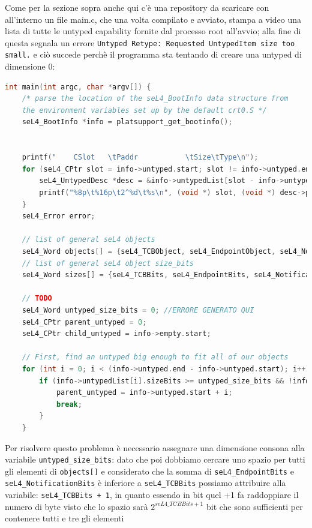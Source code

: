 Come per la sezione sopra anche qui c'è una repository da scaricare con all'interno un file main.c, che una volta compilato e avviato, stampa a video una lista di tutte le untyped capability fornite dal processo root all'avvio; alla fine di questa segnala un errore \texttt{Untyped Retype: Requested UntypedItem size too small.} e ciò succede perchè il programma sta tentando di creare una untyped di dimensione 0:
\begin{lstlisting}[basicstyle=\tiny, language=C++]
int main(int argc, char *argv[]) {
    /* parse the location of the seL4_BootInfo data structure from
    the environment variables set up by the default crt0.S */
    seL4_BootInfo *info = platsupport_get_bootinfo();


    printf("    CSlot   \tPaddr           \tSize\tType\n");
    for (seL4_CPtr slot = info->untyped.start; slot != info->untyped.end; slot++) {
        seL4_UntypedDesc *desc = &info->untypedList[slot - info->untyped.start];
        printf("%8p\t%16p\t2^%d\t%s\n", (void *) slot, (void *) desc->paddr, desc->sizeBits, desc->isDevice ? "device untyped" : "untyped");
    }
    seL4_Error error;

    // list of general seL4 objects
    seL4_Word objects[] = {seL4_TCBObject, seL4_EndpointObject, seL4_NotificationObject};
    // list of general seL4 object size_bits
    seL4_Word sizes[] = {seL4_TCBBits, seL4_EndpointBits, seL4_NotificationBits};
    
    // TODO
    seL4_Word untyped_size_bits = 0; //ERRORE GENERATO QUI
    seL4_CPtr parent_untyped = 0;
    seL4_CPtr child_untyped = info->empty.start;

    // First, find an untyped big enough to fit all of our objects
    for (int i = 0; i < (info->untyped.end - info->untyped.start); i++) {
        if (info->untypedList[i].sizeBits >= untyped_size_bits && !info->untypedList[i].isDevice) {
            parent_untyped = info->untyped.start + i;
            break;
        }
    }
\end{lstlisting}
Per risolvere questo problema è necessario assegnare una dimensione consona alla variabile \texttt{untyped\_size\_bits}: dato che poi dobbiamo cercare uno spazio per tutti gli elementi di \texttt{objects[]} e considerato che la somma di \texttt{seL4\_EndpointBits} e \texttt{seL4\_NotificationBits} è inferiore a \texttt{seL4\_TCBBits} possiamo attribuire alla variabile: \texttt{seL4\_TCBBits + 1}, in quanto essendo in bit quel +1 fa raddoppiare il numero di byte visto che lo spazio sarà $ 2^{seL4\_TCBBits + 1} $ bit che sono sufficienti per contenere tutti e tre gli elementi\\
